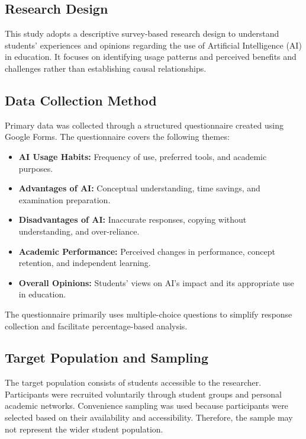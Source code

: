 \documentclass[12pt,a4paper]{article}
\begin{document}
\subsection{Research Design}

This study adopts a descriptive survey-based research design to understand students' experiences and opinions regarding the use of Artificial Intelligence (AI) in education. It focuses on identifying usage patterns and perceived benefits and challenges rather than establishing causal relationships.

\subsection{Data Collection Method}

Primary data was collected through a structured questionnaire created using Google Forms. The questionnaire covers the following themes:

\begin{itemize}
    \item \textbf{AI Usage Habits:} Frequency of use, preferred tools, and academic purposes.
    \item \textbf{Advantages of AI:} Conceptual understanding, time savings, and examination preparation.
    \item \textbf{Disadvantages of AI:} Inaccurate responses, copying without understanding, and over-reliance.
    \item \textbf{Academic Performance:} Perceived changes in performance, concept retention, and independent learning.
    \item \textbf{Overall Opinions:} Students' views on AI's impact and its appropriate use in education.
\end{itemize}

The questionnaire primarily uses multiple-choice questions to simplify response collection and facilitate percentage-based analysis.

\subsection{Target Population and Sampling}

The target population consists of students accessible to the researcher. Participants were recruited voluntarily through student groups and personal academic networks. Convenience sampling was used because participants were selected based on their availability and accessibility. Therefore, the sample may not represent the wider student population.
\end{document}
